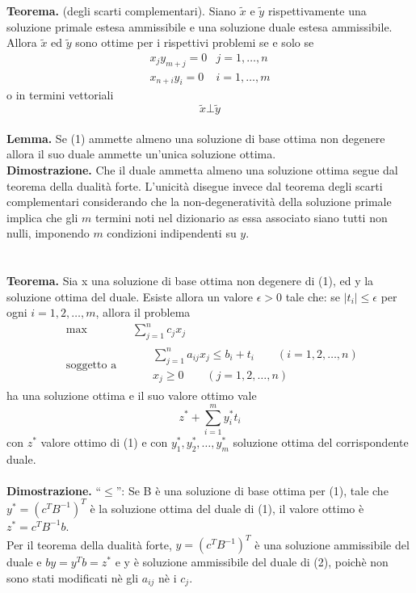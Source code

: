 \documentclass[a4paper,11pt]{article}
\begin{document}
	\textbf{Teorema.} (degli scarti complementari).
		Siano $\tilde{x}$ e $\tilde{y}$ rispettivamente una soluzione primale estesa ammissibile e una soluzione duale estesa ammissibile. Allora $\tilde{x}$ ed $\tilde{y}$ sono ottime per i rispettivi problemi se e solo se 
		\begin{eqnarray*}
			x_jy_{m+j}=0 & j = 1,\ldots,n \\
			x_{n+i}y_i=0 & i = 1,\ldots,m
		\end{eqnarray*}
		o in termini vettoriali 
		\begin{equation*}
		\tilde{x} \bot \tilde{y}
		\end{equation*}
\\
	\textbf{Lemma.} Se (1) ammette almeno una soluzione di base ottima non degenere
	allora il suo duale ammette un'unica soluzione ottima.\\
        \textbf{Dimostrazione.}
           Che il duale ammetta almeno una soluzione ottima segue dal teorema della dualit\`a forte. L'unicit\`a disegue invece dal teorema degli scarti complementari considerando che la non-degenerativit\`a della soluzione primale implica che gli $m$ termini noti nel dizionario as essa associato siano tutti non nulli, imponendo $m$ condizioni indipendenti su $y$. \Square \\
	\\
	\\
	\textbf{Teorema.} Sia x una soluzione di base ottima non degenere di (1), ed y la soluzione ottima del duale. Esiste allora un valore $\epsilon > 0$ tale che: se $|t_i|\leq \epsilon$ per ogni $i=1,2,\ldots,m$, allora il problema  
		\begin{equation}\begin{split}
	&\text{max}\qquad\qquad\sum_{j=1}^{n}c_jx_j\\
	&\text{soggetto a} \qquad\begin{split} &\sum_{j=1}^{n}a_{ij}x_j \leq b_i + t_i \qquad(i=1,2,\ldots,n) \\
	&x_j\geq0 \qquad(j=1,2,\ldots,n)\end{split}
	\end{split}\end{equation}
	ha una soluzione ottima e il suo valore ottimo vale
	$$z^* + \sum_{i=1}^{m}y^*_it_i$$
	con $z^*$ valore ottimo di (1) e con $y^*_1,y^*_2,\ldots,y^*_m$ soluzione ottima del corrispondente duale.\\
	\\
	\textbf{Dimostrazione.} \textquotedblleft$ \leq $\textquotedblright : Se B è una soluzione di base ottima per (1), tale che $y^*=(c^TB^{-1})^T$ è la soluzione ottima del duale di (1), il valore ottimo è $z^*=c^TB^{-1}b$. \\Per il teorema della dualità forte, $y=(c^TB^{-1})^T$ è una soluzione ammissibile del duale e $by=y^Tb=z^*$ e y è soluzione ammissibile del duale di (2), poichè non sono stati modificati nè gli $a_{ij}$ nè i $c_j$.
\end{document}
